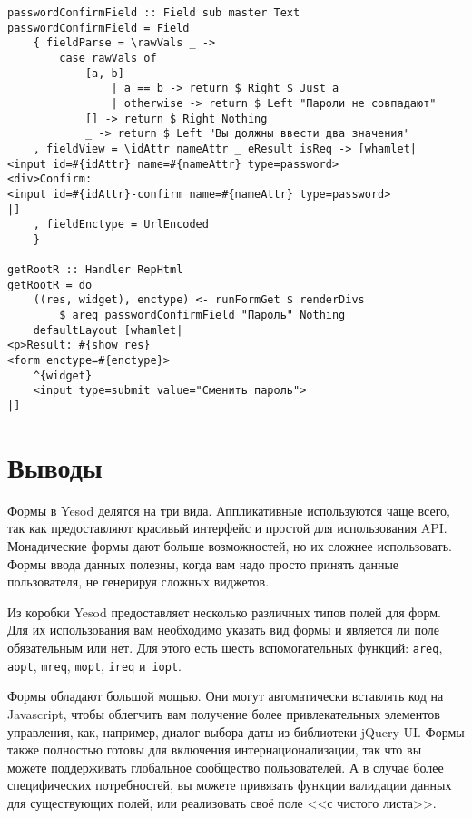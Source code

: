 \begin{lstlisting}
passwordConfirmField :: Field sub master Text
passwordConfirmField = Field
    { fieldParse = \rawVals _ ->
        case rawVals of
            [a, b]
                | a == b -> return $ Right $ Just a
                | otherwise -> return $ Left "Пароли не совпадают"
            [] -> return $ Right Nothing
            _ -> return $ Left "Вы должны ввести два значения"
    , fieldView = \idAttr nameAttr _ eResult isReq -> [whamlet|
<input id=#{idAttr} name=#{nameAttr} type=password>
<div>Confirm:
<input id=#{idAttr}-confirm name=#{nameAttr} type=password>
|]
    , fieldEnctype = UrlEncoded
    }

getRootR :: Handler RepHtml
getRootR = do
    ((res, widget), enctype) <- runFormGet $ renderDivs
        $ areq passwordConfirmField "Пароль" Nothing
    defaultLayout [whamlet|
<p>Result: #{show res}
<form enctype=#{enctype}>
    ^{widget}
    <input type=submit value="Сменить пароль">
|]
\end{lstlisting}

\section{Выводы}
Формы в Yesod делятся на три вида. Аппликативные используются чаще всего, так
как предоставляют красивый интерфейс и простой для использования API.
Монадические формы дают больше возможностей, но их сложнее использовать. Формы
ввода данных полезны, когда вам надо просто принять данные пользователя, не
генерируя сложных виджетов.

Из коробки Yesod предоставляет несколько различных типов полей для форм. Для
их использования вам необходимо указать вид формы и является ли поле
обязательным или нет. Для этого есть шесть вспомогательных функций:
\lstinline'areq', \lstinline'aopt', \lstinline'mreq', \lstinline'mopt',
\lstinline'ireq' и~\lstinline'iopt'.

Формы обладают большой мощью. Они могут автоматически вставлять код на
Javascript, чтобы облегчить вам получение более привлекательных элементов управления,
как, например, диалог выбора даты из библиотеки jQuery UI. Формы также
полностью готовы для включения интернационализации, так что вы можете
поддерживать глобальное сообщество пользователей. А в случае более
специфических потребностей, вы можете привязать функции валидации данных для
существующих полей, или реализовать своё поле <<с чистого листа>>.
